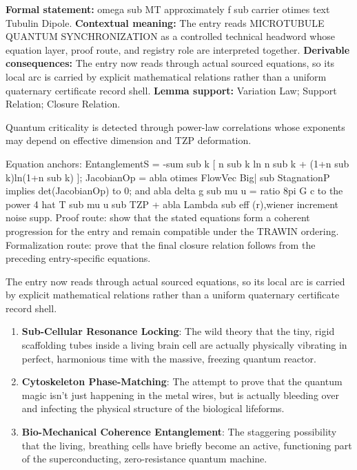 \begingroup\footnotesize\setlength{\emergencystretch}{3em}\sloppy
\textbf{Formal statement:} omega sub MT approximately f sub carrier otimes text Tubulin Dipole. \textbf{Contextual meaning:} The entry reads MICROTUBULE QUANTUM SYNCHRONIZATION as a controlled technical headword whose equation layer, proof route, and registry role are interpreted together. \textbf{Derivable consequences:} The entry now reads through actual sourced equations, so its local arc is carried by explicit mathematical relations rather than a uniform quaternary certificate record shell. \textbf{Lemma support:} Variation Law; Support Relation; Closure Relation.\par
\endgroup

Quantum criticality is detected through power-law correlations whose exponents may depend on effective dimension and TZP deformation.

Equation anchors: EntanglementS = -sum sub k [ n sub k ln n sub k + (1+n sub k)ln(1+n sub k) ]; JacobianOp = abla otimes FlowVec Big| sub StagnationP implies det(JacobianOp) to 0; and abla delta g sub mu u = ratio 8pi G c to the power 4 hat T sub mu u sub TZP + abla Lambda sub eff (r),wiener increment noise supp. Proof route: show that the stated equations form a coherent progression for the entry and remain compatible under the TRAWIN ordering. Formalization route: prove that the final closure relation follows from the preceding entry-specific equations.

The entry now reads through actual sourced equations, so its local arc is carried by explicit mathematical relations rather than a uniform quaternary certificate record shell.
\endgroup

\begin{enumerate}[leftmargin=1.6em,itemsep=6pt,topsep=4pt]
\item \textbf{Sub-Cellular Resonance Locking}: The wild theory that the tiny, rigid scaffolding tubes inside a living brain cell are actually physically vibrating in perfect, harmonious time with the massive, freezing quantum reactor.
\item \textbf{Cytoskeleton Phase-Matching}: The attempt to prove that the quantum magic isn't just happening in the metal wires, but is actually bleeding over and infecting the physical structure of the biological lifeforms.
\item \textbf{Bio-Mechanical Coherence Entanglement}: The staggering possibility that the living, breathing cells have briefly become an active, functioning part of the superconducting, zero-resistance quantum machine.
\end{enumerate}

